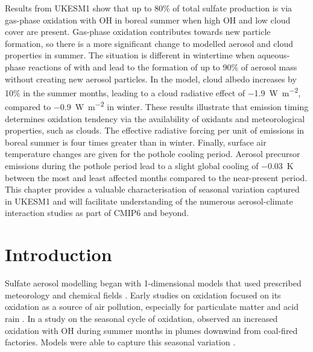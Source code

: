 Results from UKESM1 show that up to 80\% of total sulfate production is via gas-phase oxidation with OH in boreal summer when high OH and low cloud cover are present. Gas-phase oxidation contributes towards new particle formation, so there is a more significant change to modelled aerosol and cloud properties in summer. The situation is different in wintertime when aqueous-phase reactions of  with  and  lead to the formation of up to 90\% of aerosol mass without creating new aerosol particles. In the model, cloud albedo increases by 10\% in the summer months, leading to a cloud radiative effect of \qty{-1.9}{W~m^{-2}}, compared to \qty{-0.9}{W~m^{-2}} in winter. These results illustrate that emission timing determines oxidation tendency via the availability of oxidants and meteorological properties, such as clouds. The effective radiative forcing per unit of  emissions in boreal summer is four times greater than in winter. Finally, surface air temperature changes are given for the pothole cooling period. Aerosol precursor emissions during the pothole period lead to a slight global cooling of \qty{-0.03}{\kelvin} between the most and least affected months compared to the near-present period. This chapter provides a valuable characterisation of seasonal variation captured in UKESM1 and will facilitate understanding of the numerous aerosol-climate interaction studies as part of CMIP6 and beyond.


\section{Introduction}
\label{ch4:intro}

Sulfate aerosol modelling began with 1-dimensional models that used prescribed meteorology and chemical fields \citep[e.g.,][]{rodheGlobalDistributionSulfur1980, meagherSeasonalVariationAtmospheric1983, ericksoniiiGlobalOceantoatmosphereDimethyl1990}. Early studies on  oxidation focused on its oxidation as a source of air pollution, especially for particulate matter and acid rain \citep[e.g.][]{gillaniGasparticleConversionSulfur1983,eatoughConversionSO2Sulfate1994}. In a study on the seasonal cycle of  oxidation, \citet{meagherSeasonalVariationAtmospheric1983} observed an increased  oxidation with OH during summer months in plumes downwind from coal-fired factories. Models were able to capture this seasonal variation \citep{meagherSeasonalVariationAtmospheric1983,eatoughConversionSO2Sulfate1994}. 

